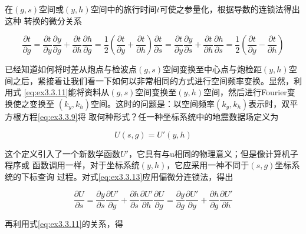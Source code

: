 在$(g,s)$空间或$(y,h)$空间中的旅行时间$t$可使之参量化，根据导数的连锁法得出这种
转换的微分关系

\begin{subequations}
\begin{equation}
\frac{\partial t}{\partial g}=\frac{\partial t}{\partial y}\frac{\partial y}{\partial g}+
\frac{\partial t}{\partial h}\frac{\partial h}{\partial g}=\frac{1}{2}(\frac{\partial t}{\partial y}+\frac{\partial t}{\partial h})
\label{eq:ex3.3.12a}
\end{equation}
\begin{equation}
\frac{\partial t}{\partial s}=\frac{\partial t}{\partial y}\frac{\partial y}{\partial s}+
\frac{\partial t}{\partial h}\frac{\partial h}{\partial s}=\frac{1}{2}(\frac{\partial t}{\partial y}-\frac{\partial t}{\partial h})
\label{eq:ex3.3.12b}
\end{equation}
\end{subequations}

已经知道如何将时差从炮点与检波点$(g,s)$空间变换至中心点与炮检距$(y,h)$空
间之后，紧接着让我们看一下如何以非常相同的方式进行空间频率变换。显然，利用式
\ref{eq:ex3.3.11}能将资料从$(g,s)$空间变换至$(y,h)$空间，然后进行Fourier变换使之变换至
$(k_y,k_h)$空间。这时的问题是：以空间频率$(k_y,k_h)$表示时，双平方根方程\ref{eq:ex3.3.9}将
取何种形式？任一种坐标系统中的地震数据场定义为

\begin{equation}
U(s,g)=U'(y,h)
\label{eq:ex3.3.13}
\end{equation}

这个定义引入了一个新数学函数$U'$，它具有与u相同的物理意义；但是像计算机子程序或
函数调用一样，对于坐标系统$(y,h)$，它应采用一神不同于$(s,g)$坐标系统的下标查询
过程。对式\ref{eq:ex3.3.13}应用偏微分连锁法，得出

\begin{subequations}
\begin{equation}
\frac{\partial U}{\partial s}=\frac{\partial y}{\partial s}\frac{\partial U'}{\partial y}+
\frac{\partial h}{\partial s}\frac{\partial U'}{\partial h}
\label{eq:ex3.3.14a}
\end{equation}
\begin{equation}
\frac{\partial U}{\partial g}=\frac{\partial y}{\partial g}\frac{\partial U'}{\partial y}+
\frac{\partial h}{\partial g}\frac{\partial U'}{\partial h}
\label{eq:ex3.3.14b}
\end{equation}
\end{subequations}

再利用式\ref{eq:ex3.3.11}的关系，得


